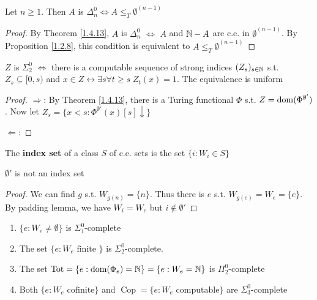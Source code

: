 \documentclass[11pt]{article}
\DeclareMathOperator{\Cop}{Cop}
\begin{document}
\begin{proposition}[]
Let \(n\ge 1\). Then \(A\) is \(\Delta_n^0\Leftrightarrow A\le_T\emptyset^{(n-1)}\)
\end{proposition}

\begin{proof}
By Theorem \ref{1.4.13}, \(A\) is \(\Delta_n^0\) \(\Leftrightarrow\) \(A\) and \(\mathbb{N}-A\) are c.e. in \(\emptyset^{(n-1)}\). By
Proposition \ref{1.2.8}, this condition is equivalent to \(A\le_T\emptyset^{(n-1)}\)
\end{proof}

\begin{proposition}[]
\(Z\) is \(\Sigma_2^0\) \(\Leftrightarrow\) there is a computable sequence of strong indices \((Z_s)_{s\in\mathbb{N}}\)
s.t. \(Z_s\subseteq[0,s)\) and \(x\in Z\leftrightarrow\exists s\forall t\ge s\;Z_t(x)=1\). The equivalence is uniform
\end{proposition}

\begin{proof}
\(\Rightarrow\): By Theorem \ref{1.4.13}, there is a Turing functional \(\Phi\) s.t. \(Z=\operatorname{dom}(\Phi^{\emptyset'})\). Now
let \(Z_s=\{x<s:\Phi^{\emptyset'}(x)[s]\downarrow\}\)

\(\Leftarrow\):
\end{proof}

\begin{definition}[]
The \textbf{index set} of a class \(S\) of c.e. sets is the set \(\{i:W_i\in S\}\)
\end{definition}


\begin{exercise}
\label{1.4.19}
\(\emptyset'\) is not an index set
\end{exercise}

\begin{proof}
We can find \(g\) s.t. \(W_{g(n)}=\{n\}\). Thus there is \(e\) s.t. \(W_{g(e)}=W_e=\{e\}\). By
padding lemma, we have \(W_i=W_e\) but \(i\notin\emptyset'\)
\end{proof}



\begin{exercise}
\label{1.4.20}
\begin{enumerate}
\item \(\{e:W_e\neq\emptyset\}\) is \(\Sigma_1^0\)-complete
\item The set \(\{e:W_e\text{ finite }\}\) is \(\Sigma_2^0\)-complete.
\item The set \(\operatorname{Tot}=\{e:\operatorname{dom}(\Phi_e)=\mathbb{N}\}=\{e:W_e=\mathbb{N}\}\) is \(\Pi_2^0\)-complete
\item Both \(\{e:W_e\text{ cofinite}\}\) and \(\Cop=\{e:W_e\text{ computable}\}\) are \(\Sigma_3^0\)-complete
\end{enumerate}
\end{exercise}
\end{document}
